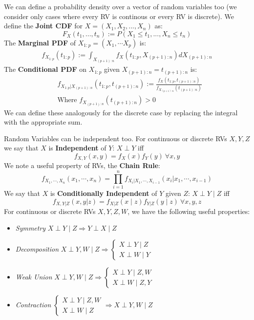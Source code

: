 \documentclass[]{article}
\theoremstyle{mattstyle}
\theoremstyle{definition}
\begin{document}
We can define a probability density over a vector of random variables too (we consider only cases where every RV is continous or every RV is discrete). We define the \textbf{Joint CDF} for \( X = (X_1, X_2, ..., X_n)\) as: 
$$F_X(t_1,...,t_n) := P(X_1 \le t_1, ..., X_n \le t_n)$$
The \textbf{Marginal PDF} of \(X_{1:p} = (X_{1}, \cdots X_{p})\) is:
	\begin{align*}
	f_{X_{1:p}}\left(t_{1:p}\right) := \int_{X_{(p+1):n}}f_{X}\left(t_{1:p}, X_{(p+1):n}\right)dX_{(p+1):n}
	\end{align*}
The \textbf{Conditional PDF} on \(X_{1:p}\) given \(X_{(p+1):n}=t_{(p+1):n}\) is:
	\begin{align*}
	&f_{X_{1:p} | X_{(p+1):n}}\left(t_{1:p}, t_{(p+1):n}\right) :=\frac{f_{X}\left(t_{1:p}, t_{(p+1):n}\right)}{f_{X_{(p+1):n}}\left(t_{(p+1):n}\right)}\\
	&\text{Where $f_{X_{(p+1):n}}\left(t_{(p+1):n}\right) > 0$}
	\end{align*}
We can define these analogously for the discrete case by replacing the integral with the appropriate sum.

\newpage

Random Variables can be independent too. For continuous or discrete RVs $X,Y, Z$ we say that $X$ is \textbf{Independent} of $Y$: $X \perp Y$ iff
$$ f_{X,Y}(x,y) = f_X(x)f_Y(y) \ \forall x,y$$
We note a useful property of RVs, the \textbf{Chain Rule}:
$$f_{X_1,\cdots,X_n}(x_1, \cdots, x_n) = \prod_{i=1}^{n}f_{X_i|X_1, \cdots, X_{i-1}}(x_i|x_1, \cdots, x_{i-1})$$
We say that $X$ is \textbf{Conditionally Independent} of $Y$ given $Z$: $X 	\perp Y \mid Z$ iff 
$$f_{X,Y| Z}(x,y|z) = f_{X|Z}(x \mid z)f_{Y|Z}(y \mid z) \ \forall x,y,z$$
For continuous or discrete RVs $X,Y,Z,W$, we have the following useful properties:

\begin{itemize}
	\item \emph{Symmetry} $X \perp Y \mid Z \Rightarrow Y \perp X \mid Z$ 
	\item  \emph{Decomposition} $X \perp Y,W \mid Z \Rightarrow 
	\begin{cases}
	X \perp Y \mid Z \\
	X \perp W \mid Y
	\end{cases}$ 
	\item \emph{Weak Union} $X \perp Y,W \mid Z \Rightarrow 	
	\begin{cases}
	X \perp Y \mid Z, W \\
	X \perp W \mid Z, Y
	\end{cases}$ 
	\item \emph{Contraction} $\begin{cases}
	X \perp Y \mid Z,W \\
	X \perp W \mid Z
	\end{cases}
	\Rightarrow X \perp Y, W \mid Z
	$ 
\end{itemize}
\end{document}
